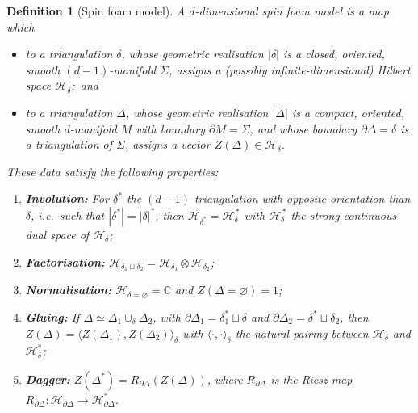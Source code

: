 \documentclass[11pt]{article}
\newtheorem{definition}{Definition}[section]
\theoremstyle{definition}
\numberwithin{equation}{section}
\begin{document}
\begin{definition}[Spin foam model] \label{def:truncSF} A $d$-dimensional spin foam model is a map which
\begin{itemize}
    \item to a triangulation $\delta$, whose geometric realisation $|\delta|$ is a closed, oriented, smooth $(d{-}1)$-manifold $\Sigma$, assigns a (possibly infinite-dimensional) Hilbert space $\mathcal{H}_\delta$;~and
    \item to a triangulation $\Delta$, whose geometric realisation $|\Delta|$ is a compact, oriented, smooth $d$-manifold $M$ with boundary $\partial M = \Sigma$, and whose boundary $\partial \Delta = \delta$ is a triangulation of $\Sigma$, assigns a vector $Z(\Delta) \in \mathcal{H}_\delta$.
\end{itemize}
These data satisfy the following properties:
\begin{enumerate}
    \item \textbf{Involution:} For $\delta^*$ the $(d-1)$-triangulation with opposite orientation than $\delta$, i.e.~such that $|\delta^*|=|\delta|^*$, then $\mathcal{H}_{\delta^*} = \mathcal{H}_\delta^{\,*}$ with $\mathcal{H}_\delta^{\,*}$ the strong continuous dual space of $\mathcal{H}_\delta$;
    
    \item \textbf{Factorisation:} $\mathcal{H}_{\delta_1 \sqcup \delta_2} = \mathcal{H}_{\delta_1} \otimes \mathcal{H}_{\delta_2}$;
    
    \item \textbf{Normalisation:} $\mathcal{H}_{\delta = \varnothing} = \mathbb{C}$ and $Z(\Delta=\varnothing) = 1$;
    
    \item \textbf{Gluing:} If $\Delta \simeq \Delta_1 \cup_{\delta} \Delta_2$, with $\partial \Delta_1 = \delta_1^* \sqcup \delta$ and $\partial \Delta_2 = \delta^* \sqcup \delta_2$, then $Z(\Delta) = \langle Z(\Delta_1), Z(\Delta_2) \rangle_\delta$ with $\langle \cdot , \cdot \rangle_\delta$ the natural pairing between $\mathcal{H}_\delta$ and $\mathcal{H}_\delta^*$;
    
    \item \textbf{Dagger:} $Z(\Delta^*) = R_{\partial \Delta}(Z(\Delta))$, where $R_{\partial \Delta}$ is the Riesz map $R_{\partial \Delta} \colon \mathcal{H}_{\partial \Delta} \to \mathcal{H}_{\partial \Delta}^*$.
\end{enumerate}
\end{definition}
\end{document}
